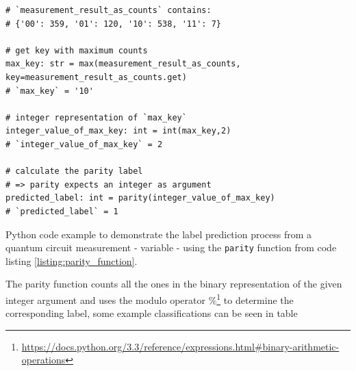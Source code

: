 \begin{listing}[!ht]
    \begin{verbatim}
# `measurement_result_as_counts` contains: 
# {'00': 359, '01': 120, '10': 538, '11': 7}

# get key with maximum counts
max_key: str = max(measurement_result_as_counts, key=measurement_result_as_counts.get)
# `max_key` = '10'

# integer representation of `max_key`
integer_value_of_max_key: int = int(max_key,2)
# `integer_value_of_max_key` = 2

# calculate the parity label
# => parity expects an integer as argument
predicted_label: int = parity(integer_value_of_max_key)
# `predicted_label` = 1
    \end{verbatim}
    \caption{Python code example to demonstrate the label prediction process from a quantum circuit measurement - variable  - using the \texttt{parity} function from code listing \ref{listing:parity_function}.}
    \label{listing:parity_function_demonstration_example}
\end{listing}

The parity function counts all the ones in the binary representation of the given integer argument and uses the modulo operator $\%$\footnote{\url{https://docs.python.org/3.3/reference/expressions.html#binary-arithmetic-operations}} to determine the corresponding label, some example classifications can be seen in table 

\begin{table}[!h]
	\centering
	\caption{Example calculation of labels using the \texttt{parity} function (code listing \ref{listing:parity_function}) with \texttt{NUMBER_OF_LABELS = 3} three labels (classes) showing all possible outcomes from a three qubit circuit measurement.}
	\label{table:qnn_binary_datasets}
\end{table}

